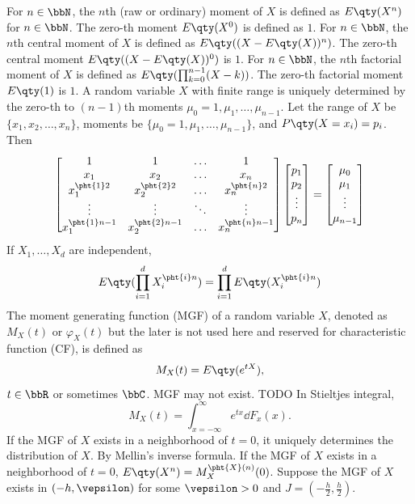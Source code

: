 \documentclass[a4paper,12pt]{report}
\begin{document}
\epr
{}
For $n\in\bbN$, the $n$th (raw or ordinary) moment of $X$ is defined as $E\qty(X^n)$ for $n\in\bbN$. The zero-th moment $E\qty(X^0)$ is defined as $1$.
For $n\in\bbN$, the $n$th central moment of $X$ is defined as $E\qty((X-E\qty(X))^n)$. The zero-th central moment $E\qty((X-E\qty(X))^0)$ is $1$.
For $n\in\bbN$, the $n$th factorial moment of $X$ is defined as $E\qty(\prod_{k=0}^{n-1}(X-k))$. The zero-th factorial moment $E\qty(1)$ is $1$.
A random variable $X$ with finite range is uniquely determined by the zero-th to $(n-1)$th moments $\mu_0=1,\mu_1,\ldots,\mu_{n-1}$.
\bpr
Let the range of $X$ be $\{x_1,x_2,\ldots,x_n\}$, moments be $\{\mu_0=1,\mu_1,\ldots,\mu_{n-1}\}$, and $P\qty(X=x_i)=p_i$. Then
\[\begin{bmatrix}
1 &  1 & \ldots & 1 \\
x_1 & x_2 & \ldots & x_n \\
x_1^{\pht{1}2} & x_2^{\pht{2}2} & \ldots & x_n^{\pht{n}2} \\
\vdots & \vdots & \ddots & \vdots \\
x_1^{\pht{1}n-1} & x_2^{\pht{2}n-1} & \ldots & x_n^{\pht{n}n-1}
\end{bmatrix}
\begin{bmatrix}
p_1 \\ p_2 \\ \vdots \\ p_n
\end{bmatrix}
=
\begin{bmatrix}
\mu_0 \\ \mu_1 \\ \vdots \\ \mu_{n-1}
\end{bmatrix}\]
\epr
{}
If $X_1,\ldots,X_d$ are independent,
\[E\qty(\prod_{i=1}^dX_i^{\pht{i}n})=\prod_{i=1}^dE\qty(X_i^{\pht{i}n})\]
The moment generating function (MGF) of a random variable $X$, denoted as $M_X(t)$ or $\varphi_X(t)$ but the later is not used here and reserved for characteristic function (CF), is defined as
\[M_X(t)=E\qty(e^{tX}),\]
$t\in\bbR$ or sometimes $\bbC$.
MGF may not exist.
\bpr
TODO
\epr
{}
In Stieltjes integral,
\[M_X(t)=\int_{x=-\infty}^{\infty}e^{tx}\dd{F_x(x)}.\]
If the MGF of $X$ exists in a neighborhood of $t=0$, it uniquely determines the distribution of $X$.
\bpr
By Mellin's inverse formula.
\epr
{}
If the MGF of $X$ exists in a neighborhood of $t=0$, $E\qty(X^n)=M_X^{\pht{X}(n)}(0)$.
\bpr
Suppose the MGF of $X$ exists in $(-h,\vepsilon)$ for some $\vepsilon>0$ and $J=\left(-\frac{h}{2},\frac{h}{2}\right)$.
\end{document}
